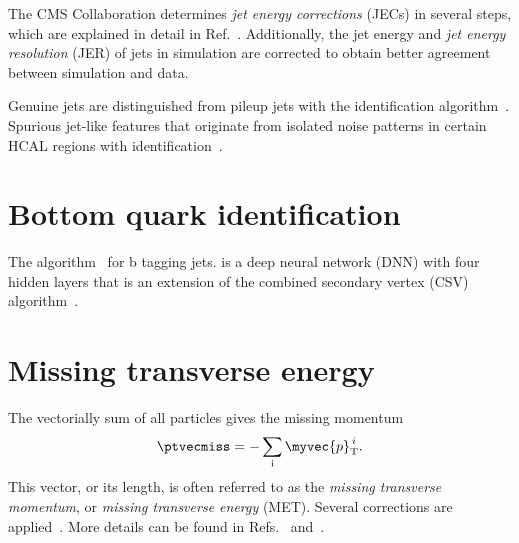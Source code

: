 The CMS Collaboration determines \emph{jet energy corrections} (JECs) in several steps, which are explained in detail in Ref.~\cite{CMS-JME-10-011}.
Additionally, the jet energy and \emph{jet energy resolution} (JER) of jets in simulation are corrected to obtain better agreement between simulation and data.

Genuine jets are distinguished from pileup jets with the identification algorithm~\cite{jetPUID}.
Spurious jet-like features that originate from isolated noise patterns in certain HCAL regions with identification~\cite{jetID_2016}.


\section{Bottom quark identification} \label{sec:btagging}



The \DeepCSV algorithm~\cite{btag_deepCSV,btag_2018} for b tagging jets. \DeepCSV is a deep neural network (DNN) with four hidden layers that is an extension of the combined secondary vertex (CSV) algorithm~\cite{btag_deepCSV,btag_2018}.


\section{Missing transverse energy}\label{sec:met}



The vectorially sum of all particles gives the missing momentum
\begin{equation} \label{eq:MET}
  \ptvecmiss = - \sum_{\text{i}}\myvec{p}_\text{T}^{\,i}.
\end{equation}
This vector, or its length, is often referred to as the \emph{missing transverse momentum}, or \emph{missing transverse energy} (MET).
Several corrections are applied~\cite{PF2017}.
More details can be found in Refs.~\cite{CMS-PAS-JME-16-004} and~\cite{CMS-PAS-JME-17-001}. 

